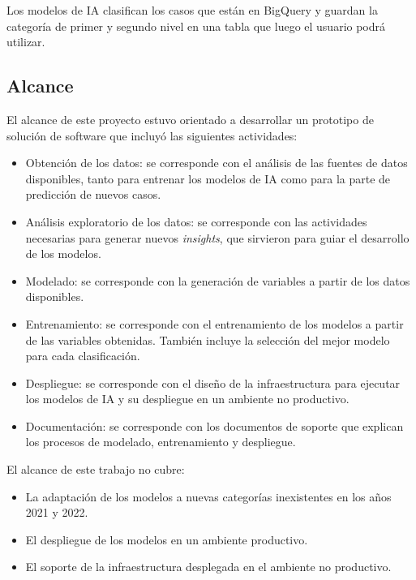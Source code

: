 Los modelos de IA clasifican los casos que están en BigQuery y guardan la categoría de primer y segundo nivel en una tabla que luego el usuario podrá utilizar.

\subsection{Alcance}

El alcance de este proyecto estuvo orientado a desarrollar un prototipo de solución de software que incluyó las siguientes actividades:
\begin{itemize}
\item Obtención de los datos: se corresponde con el análisis de las fuentes de datos disponibles, tanto para entrenar los modelos de IA como para la parte de predicción de nuevos casos.
\item Análisis exploratorio de los datos: se corresponde con las actividades necesarias para generar nuevos \textit{insights}, que sirvieron para guiar el desarrollo de los modelos.
\item Modelado: se corresponde con la generación de variables a partir de los datos disponibles.
\item Entrenamiento: se corresponde con el entrenamiento de los modelos a partir de las variables obtenidas. También incluye la selección del mejor modelo para cada clasificación.
\item Despliegue: se corresponde con el diseño de la infraestructura para ejecutar los modelos de IA y su despliegue en un ambiente no productivo.
\item Documentación: se corresponde con los documentos de soporte que explican los procesos de modelado, entrenamiento y despliegue.
\end{itemize}

El alcance de este trabajo no cubre:
\begin{itemize}
\item La adaptación de los modelos a nuevas categorías inexistentes en los años 2021 y 2022.
\item El despliegue de los modelos en un ambiente productivo.
\item El soporte de la infraestructura desplegada en el ambiente no productivo.
\end{itemize}